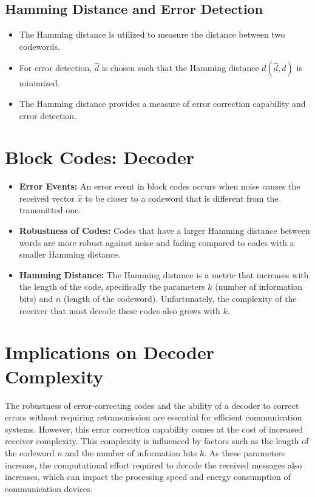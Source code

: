 \subsection*{Hamming Distance and Error Detection}
\begin{itemize}
    \item The Hamming distance is utilized to measure the distance between two codewords.
    \item For error detection, \( \hat{d} \) is chosen such that the Hamming distance \( d(\hat{d},d) \) is minimized.
    \item The Hamming distance provides a measure of error correction capability and error detection.
\end{itemize}


\section*{Block Codes: Decoder}

\begin{itemize}
    \item \textbf{Error Events:} An error event in block codes occurs when noise causes the received vector \(\hat{x}\) to be closer to a codeword that is different from the transmitted one.
    \item \textbf{Robustness of Codes:} Codes that have a larger Hamming distance between words are more robust against noise and fading compared to codes with a smaller Hamming distance.
    \item \textbf{Hamming Distance:} The Hamming distance is a metric that increases with the length of the code, specifically the parameters \(k\) (number of information bits) and \(n\) (length of the codeword). Unfortunately, the complexity of the receiver that must decode these codes also grows with \(k\).
\end{itemize}

\section*{Implications on Decoder Complexity}

The robustness of error-correcting codes and the ability of a decoder to correct errors without requiring retransmission are essential for efficient communication systems. However, this error correction capability comes at the cost of increased receiver complexity. This complexity is influenced by factors such as the length of the codeword \(n\) and the number of information bits \(k\). As these parameters increase, the computational effort required to decode the received messages also increases, which can impact the processing speed and energy consumption of communication devices.


